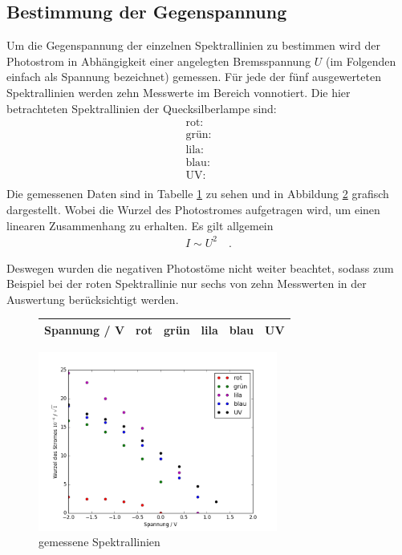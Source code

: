\subsection{Bestimmung der Gegenspannung}
Um die Gegenspannung der einzelnen Spektrallinien zu bestimmen wird der Photostrom in Abhängigkeit einer angelegten Bremsspannung $U$ (im Folgenden einfach als Spannung bezeichnet) gemessen. Für jede der fünf ausgewerteten Spektrallinien werden zehn Messwerte im Bereich vonnotiert.
Die hier betrachteten Spektrallinien der Quecksilberlampe sind:
\begin{align*}
	\text{rot:} \quad &  \\
	\text{grün:} \quad &  \\
	\text{lila:} \quad &  \\
	\text{blau:} \quad &  \\
	\text{UV:} \quad &  \\
\end{align*}
Die gemessenen Daten sind in Tabelle \ref{tab:messdaten1}  zu sehen und in Abbildung \ref{fig:spektrallinien} grafisch dargestellt. Wobei die Wurzel des Photostromes aufgetragen wird, um einen linearen Zusammenhang zu erhalten. Es gilt allgemein
\begin{align}
	I \sim U^2 \quad .
\end{align}

Deswegen wurden die negativen Photostöme nicht weiter beachtet, sodass zum Beispiel bei der roten Spektrallinie nur sechs von zehn Messwerten in der Auswertung berücksichtigt werden. \\
\begin{figure}[h!]
	\centering
	\begin{tabular}{c|ccccc}
		Spannung / V & rot & grün & lila & blau & UV \\
		\hline
		
	\end{tabular}
	\label{tab:messdaten1}
\end{figure}

\begin{figure}[h!]
	\centering
	\includegraphics[width=0.7\textwidth]{build/AlleWellenlangen.png}
	\caption{gemessene Spektrallinien}
	\label{fig:spektrallinien}
\end{figure}

